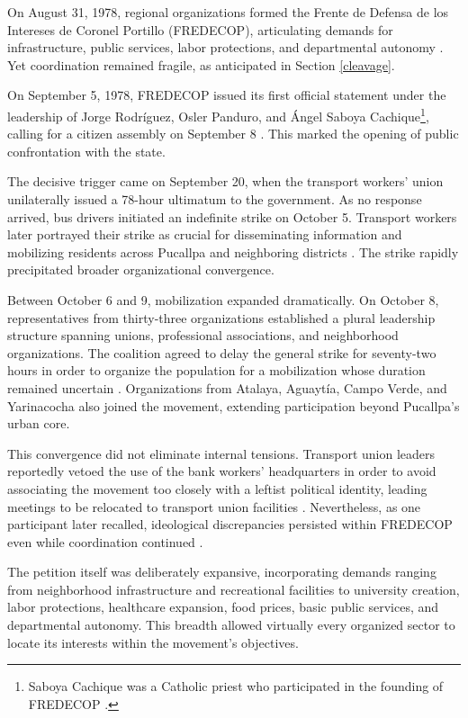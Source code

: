 \documentclass[12pt]{article}
\begin{document}
On August 31, 1978, regional organizations formed the Frente de Defensa de los Intereses de Coronel Portillo (FREDECOP), articulating demands for infrastructure, public services, labor protections, and departmental autonomy \parencite{vivanco_pimentel_gran_1997}. Yet coordination remained fragile, as anticipated in Section \ref{cleavage}.

On September 5, 1978, FREDECOP issued its first official statement under the leadership of Jorge Rodríguez, Osler Panduro, and Ángel Saboya Cachique\footnote{Saboya Cachique was a Catholic priest who participated in the founding of FREDECOP \parencite{caro_primer_2017}.}, calling for a citizen assembly on September 8 \parencite{tapuya_huaman_documental_2024}. This marked the opening of public confrontation with the state.

The decisive trigger came on September 20, when the transport workers' union unilaterally issued a 78-hour ultimatum to the government. As no response arrived, bus drivers initiated an indefinite strike on October 5. Transport workers later portrayed their strike as crucial for disseminating information and mobilizing residents across Pucallpa and neighboring districts \parencite{tapuya_huaman_documental_2024}. The strike rapidly precipitated broader organizational convergence.

Between October 6 and 9, mobilization expanded dramatically. On October 8, representatives from thirty-three organizations established a plural leadership structure spanning unions, professional associations, and neighborhood organizations. The coalition agreed to delay the general strike for seventy-two hours in order to organize the population for a mobilization whose duration remained uncertain \parencite{vivanco_pimentel_gran_1997}. Organizations from Atalaya, Aguaytía, Campo Verde, and Yarinacocha also joined the movement, extending participation beyond Pucallpa's urban core.

This convergence did not eliminate internal tensions. Transport union leaders reportedly vetoed the use of the bank workers' headquarters in order to avoid associating the movement too closely with a leftist political identity, leading meetings to be relocated to transport union facilities \parencite{tapuya_huaman_documental_2024}. Nevertheless, as one participant later recalled, ideological discrepancies persisted within FREDECOP even while coordination continued \parencite{rengifo_interview_2022}.

The petition itself was deliberately expansive, incorporating demands ranging from neighborhood infrastructure and recreational facilities to university creation, labor protections, healthcare expansion, food prices, basic public services, and departmental autonomy. This breadth allowed virtually every organized sector to locate its interests within the movement's objectives.
\end{document}
